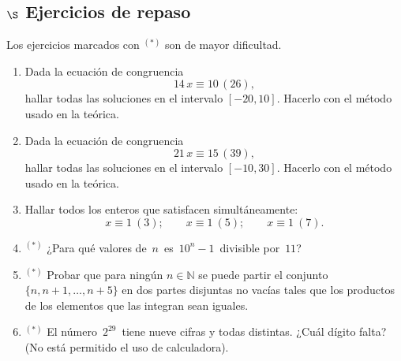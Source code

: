 \documentclass[a4paper,12pt,twoside,spanish,reqno]{amsbook}
\numberwithin{equation}{section}
\begin{document}
\subsection*{$\S$ Ejercicios de repaso} Los ejercicios marcados con ${}^{(*)}$ son de mayor dificultad.

\begin{enumerate}[resume]

\item Dada la ecuación de congruencia
    \begin{equation*}
        14\,x\equiv 10 \, (26),
    \end{equation*}
    hallar todas las soluciones en el intervalo $[-20,10]$. Hacerlo con el método usado en la teórica.

\item Dada la ecuación de congruencia
    \begin{equation*}
        21\,x\equiv 15 \, (39),
    \end{equation*}
    hallar todas las soluciones en el intervalo $[-10,30]$. Hacerlo con el método usado en la teórica. 

\item Hallar todos los enteros que satisfacen simultáneamente:
    \begin{equation*}
        x \equiv 1\ ( 3);  \qquad x \equiv 1 \ ( 5); \qquad x \equiv 1\ ( 7).
    \end{equation*}

\item${}^{(*)}$  ¿Para qué valores de \,$n$\, es \,$10^n-1$\, divisible por \,$11$?

\item${}^{(*)}$ Probar que para ningún $n\in\mathbb N$ se puede partir el conjunto $\{n,n+1,\ldots, n+5\}$ en dos partes disjuntas no vacías tales que los productos de los elementos que las integran sean iguales.

\item${}^{(*)}$  El número \,$2^{29}$\, tiene nueve cifras y todas distintas. ¿Cuál dígito falta? (No está permitido el uso de calculadora).



\end{enumerate}
\end{document}
